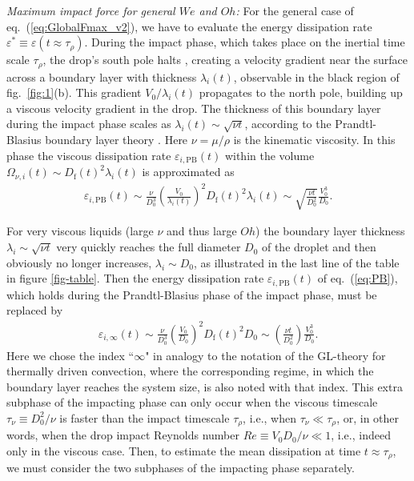 \documentclass[preprint,amssymb,superscriptaddress,aps,prl,floatfix]{revtex4-1}
\newcommand{\oo}{\color{magenta} \normalfont}
\newcommand{\bb}{\color{black} \normalfont}
\begin{document}
{\it Maximum impact force for general $We$ and $Oh$:} 
For the general case 
of  eq.\ (\ref{eq:GlobalFmax_v2}),   
we have to evaluate  the energy 
dissipation rate
$\varepsilon^* \equiv \varepsilon(t \approx \tau_\rho)$. 
During the impact phase, which takes place on
the inertial time scale $\tau_\rho$,  the drop's south pole halts \cite{renardy2003pyramidal, Biance2006}, creating a velocity gradient near the surface across a boundary layer with thickness 
$\lambda_i(t)$, observable in the black region of fig.~\ref{fig:1}(b). This gradient $V_0/\lambda_i(t)$ propagates to the north pole, building up a  viscous velocity gradient in 
the drop. The thickness of this boundary layer during the impact phase 
scales as  $\lambda_i(t) \sim \sqrt{\nu t}$, 
according to the Prandtl-Blasius boundary layer theory \cite{Prandtl1905, Blasius1908,Schlichting1979}. 
Here $\nu = \mu /\rho$ is the kinematic viscosity. 
In this phase
the viscous dissipation rate $\varepsilon_{i, \text{PB}}(t)$ within the volume $\Omega_{\nu, i}(t) \sim D_{\text{f}}(t)^2\lambda_i(t)$
is approximated as 
\begin{align}
	\label{eq:PB}
	\varepsilon_{i,\text{PB}}(t) \sim \frac{\nu}{D_0^3}\left(\frac{V_0}{\lambda_i(t)}\right)^2D_{\text{f}}(t)^2\lambda_i(t) \sim \sqrt{\frac{\nu t}{D_0^2}}\frac{V_0^3}{D_0}.
\end{align}


For very viscous liquids (large $\nu$ and thus large 
$Oh$) the boundary layer thickness $\lambda_i \sim \sqrt{\nu t}$  very quickly reaches the full diameter $D_0$
of the droplet and then obviously no longer increases, $\lambda_i \sim D_0$, as illustrated in the last line of 
the table
in figure \ref{fig-table}. 
Then the energy dissipation rate $\varepsilon_{i,\text{PB}}(t)$
of eq.\ (\ref{eq:PB}), which holds during the Prandtl-Blasius 
phase of the impact phase, must be replaced by 
\begin{align}
	\label{eq:infty}
	\varepsilon_{i,\infty}(t) \sim \frac{\nu}{D_0^3}\left(\frac{V_0}{D_0 }\right)^2D_{\text{f}}(t)^2 D_0 \sim \left(\frac{\nu t}{D_0^2}\right)\frac{V_0^3}{D_0}.
\end{align}
Here we chose the index ``$\infty$" in analogy to the notation of the
GL-theory for thermally driven convection, where the corresponding regime, in which the boundary layer reaches the system size, is also noted with that index. 
This extra subphase  of the impacting phase can only occur when 
the 
viscous timescale $\tau_\nu \equiv D_0^2/\nu$
is faster than the impact timescale $\tau_\rho$,
i.e., when $\tau_\nu \ll \tau_\rho$, or, in other
words, when the drop impact 
  Reynolds number   $Re \equiv V_0D_0/\nu \ll   1$, i.e., indeed only in the
  viscous case. Then, to estimate the mean dissipation at time $t \approx \tau_\rho$, we must consider the two subphases of the impacting phase 
  separately.  
\end{document}
